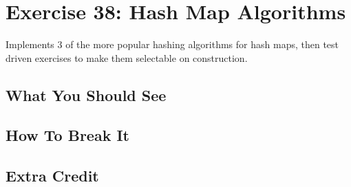 \chapter{Exercise 38: Hash Map Algorithms}

Implements 3 of the more popular hashing algorithms for hash maps, then test driven exercises to
make them selectable on construction.

\section{What You Should See}


\section{How To Break It}


\section{Extra Credit}




